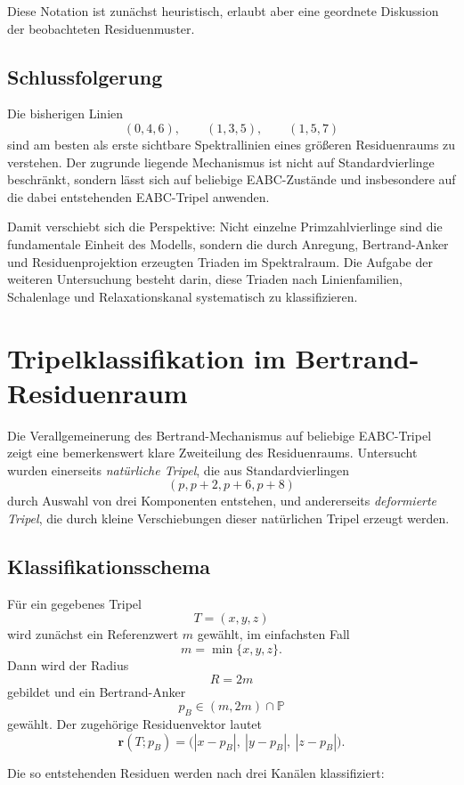 \documentclass[11pt,a4paper]{article}
\theoremstyle{definition}
\theoremstyle{plain}
\theoremstyle{remark}
\begin{document}
	Diese Notation ist zunächst heuristisch, erlaubt aber eine geordnete Diskussion der beobachteten Residuenmuster.
	
	\subsection{Schlussfolgerung}
	
	Die bisherigen Linien
	\[
	(0,4,6),\qquad (1,3,5),\qquad (1,5,7)
	\]
	sind am besten als erste sichtbare Spektrallinien eines größeren Residuenraums zu verstehen. 
	Der zugrunde liegende Mechanismus ist nicht auf Standardvierlinge beschränkt, sondern lässt sich auf beliebige EABC-Zustände und insbesondere auf die dabei entstehenden EABC-Tripel anwenden.
	
	Damit verschiebt sich die Perspektive:
	Nicht einzelne Primzahlvierlinge sind die fundamentale Einheit des Modells, sondern die durch Anregung, Bertrand-Anker und Residuenprojektion erzeugten Triaden im Spektralraum. 
	Die Aufgabe der weiteren Untersuchung besteht darin, diese Triaden nach Linienfamilien, Schalenlage und Relaxationskanal systematisch zu klassifizieren.
	
	\section{Tripelklassifikation im Bertrand-Residuenraum}
	
	Die Verallgemeinerung des Bertrand-Mechanismus auf beliebige EABC-Tripel zeigt eine bemerkenswert klare Zweiteilung des Residuenraums. 
	Untersucht wurden einerseits \emph{natürliche Tripel}, die aus Standardvierlingen
	\[
	(p,p+2,p+6,p+8)
	\]
	durch Auswahl von drei Komponenten entstehen, und andererseits \emph{deformierte Tripel}, die durch kleine Verschiebungen dieser natürlichen Tripel erzeugt werden.
	
	\subsection{Klassifikationsschema}
	
	Für ein gegebenes Tripel
	\[
	T=(x,y,z)
	\]
	wird zunächst ein Referenzwert \(m\) gewählt, im einfachsten Fall
	\[
	m=\min\{x,y,z\}.
	\]
	Dann wird der Radius
	\[
	R=2m
	\]
	gebildet und ein Bertrand-Anker
	\[
	p_B \in (m,2m)\cap\mathbb P
	\]
	gewählt. 
	Der zugehörige Residuenvektor lautet
	\[
	\mathbf r(T;p_B)
	=
	\bigl(
	|x-p_B|,\ |y-p_B|,\ |z-p_B|
	\bigr).
	\]
	
	Die so entstehenden Residuen werden nach drei Kanälen klassifiziert:
	
\end{document}
